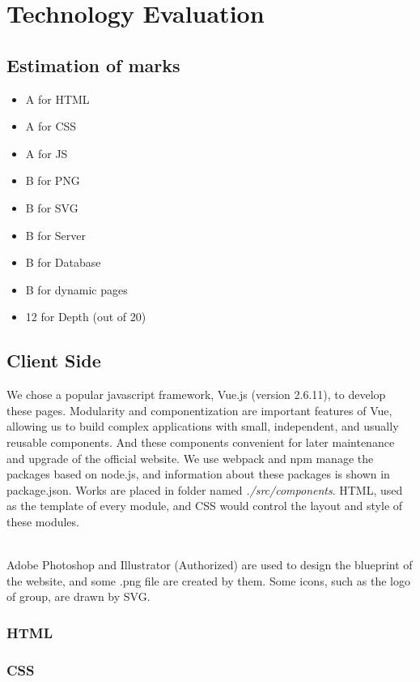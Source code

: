 \documentclass{article}
\begin{document}
\section{Technology Evaluation}
\subsection{Estimation of marks}
\begin{itemize}
    \item A for HTML
    \item A for CSS
    \item A for JS
    \item B for PNG
    \item B for SVG
    \item B for Server
    \item B for Database
    \item B for dynamic pages
    \item 12 for Depth (out of 20)
\end{itemize} 

\subsection{Client Side}
We chose a popular javascript framework, Vue.js (version 2.6.11), to 
develop these pages.
Modularity and componentization are important features of Vue,  
allowing us to build complex applications with small, independent, 
and usually reusable components. And these components convenient 
for later maintenance and upgrade of the official website. 
We use webpack and npm manage the packages based on node.js, and 
information about these packages is shown in package.json. Works are 
placed in folder named \textit{./src/components}. HTML, used as 
the template of every module, and CSS would control the layout 
and style of these modules.

~\\
\noindent
Adobe Photoshop and Illustrator (Authorized) are used to design the 
blueprint of the website, and some .png file are created by them. 
Some icons, such as the logo of group, are drawn by SVG.

\subsubsection{HTML}
\subsubsection{CSS}
\end{document}
